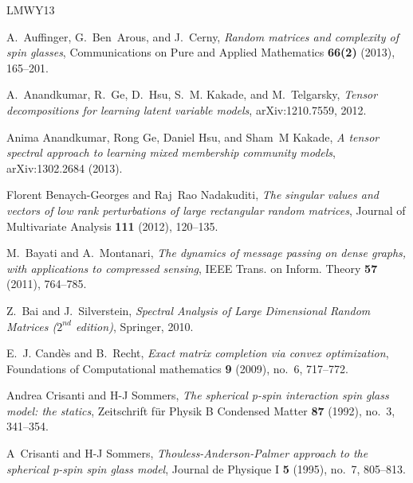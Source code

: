 \documentclass[11pt]{article}
\theoremstyle{definition}
\begin{document}
\newcommand{\etalchar}[1]{$^{#1}$}
\providecommand{\bysame}{\leavevmode\hbox to3em{\hrulefill}\thinspace}
\providecommand{\MR}{\relax\ifhmode\unskip\space\fi MR }
\providecommand{\MRhref}[2]{%
  \href{http://www.ams.org/mathscinet-getitem?mr=#1}{#2}
}
\providecommand{\href}[2]{#2}
\begin{thebibliography}{LMWY13}

A.~Auffinger, G.~Ben~Arous, and J.~Cerny, \emph{Random matrices and complexity
  of spin glasses}, Communications on Pure and Applied Mathematics
  \textbf{66(2)} (2013), 165--201.

\bibitem[AGH{\etalchar{+}}12]{anandkumar12}
A.~Anandkumar, R.~Ge, D.~Hsu, S.~M. Kakade, and M.~Telgarsky, \emph{Tensor
  decompositions for learning latent variable models}, arXiv:1210.7559, 2012.

Anima Anandkumar, Rong Ge, Daniel Hsu, and Sham~M Kakade, \emph{A tensor
  spectral approach to learning mixed membership community models}, {\sf
  arXiv:1302.2684} (2013).

Florent Benaych-Georges and Raj~Rao Nadakuditi, \emph{The singular values and
  vectors of low rank perturbations of large rectangular random matrices},
  Journal of Multivariate Analysis \textbf{111} (2012), 120--135.

M.~Bayati and A.~Montanari, \emph{{The dynamics of message passing on dense
  graphs, with applications to compressed sensing}}, IEEE Trans. on Inform.
  Theory \textbf{57} (2011), 764--785.

Z.~Bai and J.~Silverstein, \emph{{Spectral Analysis of Large Dimensional Random
  Matrices ($2^{nd}$ edition)}}, Springer, 2010.

E.~J. Cand{\`e}s and B.~Recht, \emph{Exact matrix completion via convex
  optimization}, Foundations of Computational mathematics \textbf{9} (2009),
  no.~6, 717--772.

Andrea Crisanti and H-J Sommers, \emph{The spherical p-spin interaction spin
  glass model: the statics}, Zeitschrift f{\"u}r Physik B Condensed Matter
  \textbf{87} (1992), no.~3, 341--354.

A~Crisanti and H-J Sommers, \emph{{Thouless-Anderson-Palmer approach to the
  spherical p-spin spin glass model}}, Journal de Physique I \textbf{5} (1995),
  no.~7, 805--813.


\end{thebibliography}
\end{document}
